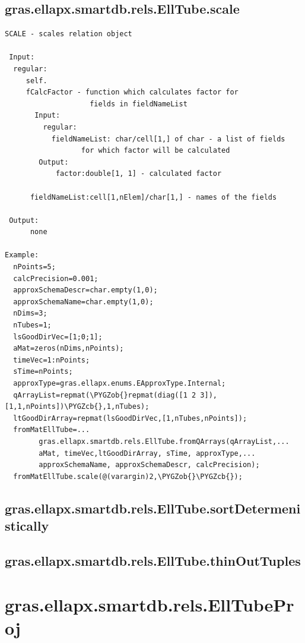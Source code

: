 \documentclass[letterpaper,10pt,english]{sphinxmanual}
\def\PYGZob{\char`\{}
\def\PYGZcb{\char`\}}
\begin{document}
\subsection{gras.ellapx.smartdb.rels.EllTube.scale}
\label{chap_functions:gras-ellapx-smartdb-rels-elltube-scale}
\begin{Verbatim}[commandchars=\\\{\}]
SCALE - scales relation object

 Input:
  regular:
     self.
     fCalcFactor - function which calculates factor for
                    fields in fieldNameList
       Input:
         regular:
           fieldNameList: char/cell[1,] of char - a list of fields
                  for which factor will be calculated
        Output:
            factor:double[1, 1] - calculated factor

      fieldNameList:cell[1,nElem]/char[1,] - names of the fields

 Output:
      none

Example:
  nPoints=5;
  calcPrecision=0.001;
  approxSchemaDescr=char.empty(1,0);
  approxSchemaName=char.empty(1,0);
  nDims=3;
  nTubes=1;
  lsGoodDirVec=[1;0;1];
  aMat=zeros(nDims,nPoints);
  timeVec=1:nPoints;
  sTime=nPoints;
  approxType=gras.ellapx.enums.EApproxType.Internal;
  qArrayList=repmat(\PYGZob{}repmat(diag([1 2 3]),[1,1,nPoints])\PYGZcb{},1,nTubes);
  ltGoodDirArray=repmat(lsGoodDirVec,[1,nTubes,nPoints]);
  fromMatEllTube=...
        gras.ellapx.smartdb.rels.EllTube.fromQArrays(qArrayList,...
        aMat, timeVec,ltGoodDirArray, sTime, approxType,...
        approxSchemaName, approxSchemaDescr, calcPrecision);
  fromMatEllTube.scale(@(varargin)2,\PYGZob{}\PYGZcb{});
\end{Verbatim}


\subsection{gras.ellapx.smartdb.rels.EllTube.sortDetermenistically}
\label{chap_functions:gras-ellapx-smartdb-rels-elltube-sortdetermenistically}

\subsection{gras.ellapx.smartdb.rels.EllTube.thinOutTuples}
\label{chap_functions:gras-ellapx-smartdb-rels-elltube-thinouttuples}

\section{gras.ellapx.smartdb.rels.EllTubeProj}
\label{chap_functions:gras-ellapx-smartdb-rels-elltubeproj}
\end{document}
